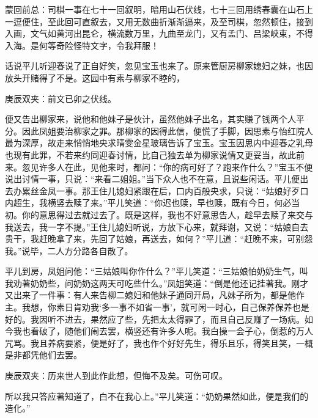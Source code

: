 

\begin{parag}
    \begin{note}蒙回前总：司棋一事在七十一回叙明，暗用山石伏线，七十三回用绣春囊在山石上一逗便住，至此回可直叙去，又用无数曲折渐渐逼来，及至司棋，忽然顿住，接到入画，文气如黄河出昆仑，横流数万里，九曲至龙门，又有孟门、吕梁峡束，不得入海。是何等奇险怪特文字，令我拜服！\end{note}
\end{parag}


\begin{parag}
    话说平儿听迎春说了正自好笑，忽见宝玉也来了。原来管厨房柳家媳妇之妹，也因放头开赌得了不是。这园中有素与柳家不睦的，\begin{note}庚辰双夹：前文已卯之伏线。\end{note}便又告出柳家来，说他和他妹子是伙计，虽然他妹子出名，其实赚了钱两个人平分。因此凤姐要治柳家之罪。那柳家的因得此信，便慌了手脚，因思素与怡红院人最为深厚，故走来悄悄地央求晴雯金星玻璃告诉了宝玉。宝玉因思内中迎春之乳母也现有此罪，不若来约同迎春讨情，比自己独去单为柳家说情又更妥当，故此前来。忽见许多人在此，见他来时，都问：“你的病可好了？跑来作什么？”宝玉不便说出讨情一事，只说：“来看二姐姐。”当下众人也不在意，且说些闲话。平儿便出去办累丝金凤一事。那王住儿媳妇紧跟在后，口内百般央求，只说：“姑娘好歹口内超生，我横竖去赎了来。”平儿笑道：“你迟也赎，早也赎，既有今日，何必当初。你的意思得过去就过去了。既是这样，我也不好意思告人，趁早去赎了来交与我送去，我一字不提。”王住儿媳妇听说，方放下心来，就拜谢，又说：“姑娘自去贵干，我赶晚拿了来，先回了姑娘，再送去，如何？”平儿道：“赶晚不来，可别怨我。”说毕，二人方分路各自散了。
\end{parag}


\begin{parag}
    平儿到房，凤姐问他：“三姑娘叫你作什么？”平儿笑道：“三姑娘怕奶奶生气，叫我劝著奶奶些，问奶奶这两天可吃些什么。”凤姐笑道：“倒是他还记挂著我。刚才又出来了一件事：有人来告柳二媳妇和他妹子通同开局，凡妹子所为，都是他作主。我想，你素日肯劝我‘多一事不如省一事’，就可闲一时心，自己保养保养也是好的。我因听不进去，果然应了些，先把太太得罪了，而且自己反赚了一场病。如今我也看破了，随他们闹去罢，横竖还有许多人呢。我白操一会子心，倒惹的万人咒骂。我且养病要紧，便是好了，我也作个好好先生，得乐且乐，得笑且笑，一概是非都凭他们去罢。\begin{note}庚辰双夹：历来世人到此作此想，但悔不及矣。可伤可叹。\end{note}所以我只答应著知道了，白不在我心上。”平儿笑道：“奶奶果然如此，便是我们的造化。”
\end{parag}


